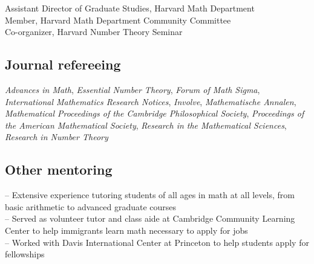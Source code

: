 \documentclass[11pt]{article} %
\begin{document}
 Assistant Director of Graduate Studies, Harvard Math Department \\
 Member, Harvard Math Department Community Committee \\
 Co-organizer, Harvard Number Theory Seminar

\subsection*{Journal refereeing}

 {\it Advances in Math}, {\it Essential Number Theory}, {\it Forum of Math Sigma}, {\it International Mathematics Research Notices}, {\it Involve}, {\it Mathematische Annalen}, {\it Mathematical Proceedings of the Cambridge Philosophical Society}, {\it Proceedings of the American Mathematical Society}, {\it Research in the Mathematical Sciences}, {\it Research in Number Theory}

 \subsection*{Other mentoring}

-- Extensive experience tutoring students of all ages in math at all levels, from basic arithmetic to advanced graduate courses \\
-- Served as volunteer tutor and class aide at Cambridge Community Learning Center to help immigrants learn math necessary to apply for jobs \\
-- Worked with Davis International Center at Princeton to help students apply for fellowships

\vfill %


\end{document}
